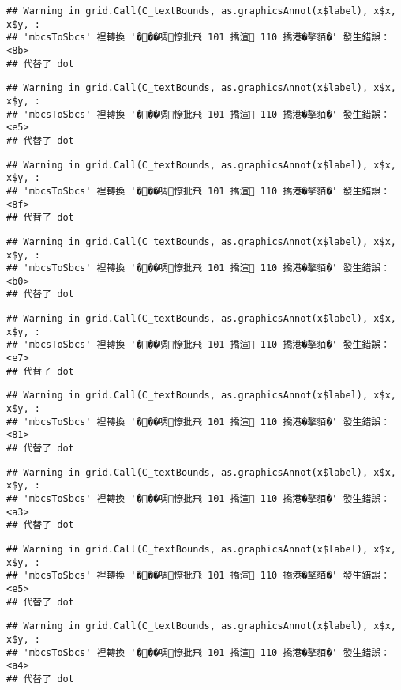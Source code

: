 \documentclass[
]{article}
\begin{document}
\begin{verbatim}
## Warning in grid.Call(C_textBounds, as.graphicsAnnot(x$label), x$x, x$y, :
## 'mbcsToSbcs' 裡轉換 '���啁憭批飛 101 撟渲 110 撟港�摮貊�' 發生錯誤：<8b>
## 代替了 dot
\end{verbatim}

\begin{verbatim}
## Warning in grid.Call(C_textBounds, as.graphicsAnnot(x$label), x$x, x$y, :
## 'mbcsToSbcs' 裡轉換 '���啁憭批飛 101 撟渲 110 撟港�摮貊�' 發生錯誤：<e5>
## 代替了 dot
\end{verbatim}

\begin{verbatim}
## Warning in grid.Call(C_textBounds, as.graphicsAnnot(x$label), x$x, x$y, :
## 'mbcsToSbcs' 裡轉換 '���啁憭批飛 101 撟渲 110 撟港�摮貊�' 發生錯誤：<8f>
## 代替了 dot
\end{verbatim}

\begin{verbatim}
## Warning in grid.Call(C_textBounds, as.graphicsAnnot(x$label), x$x, x$y, :
## 'mbcsToSbcs' 裡轉換 '���啁憭批飛 101 撟渲 110 撟港�摮貊�' 發生錯誤：<b0>
## 代替了 dot
\end{verbatim}

\begin{verbatim}
## Warning in grid.Call(C_textBounds, as.graphicsAnnot(x$label), x$x, x$y, :
## 'mbcsToSbcs' 裡轉換 '���啁憭批飛 101 撟渲 110 撟港�摮貊�' 發生錯誤：<e7>
## 代替了 dot
\end{verbatim}

\begin{verbatim}
## Warning in grid.Call(C_textBounds, as.graphicsAnnot(x$label), x$x, x$y, :
## 'mbcsToSbcs' 裡轉換 '���啁憭批飛 101 撟渲 110 撟港�摮貊�' 發生錯誤：<81>
## 代替了 dot
\end{verbatim}

\begin{verbatim}
## Warning in grid.Call(C_textBounds, as.graphicsAnnot(x$label), x$x, x$y, :
## 'mbcsToSbcs' 裡轉換 '���啁憭批飛 101 撟渲 110 撟港�摮貊�' 發生錯誤：<a3>
## 代替了 dot
\end{verbatim}

\begin{verbatim}
## Warning in grid.Call(C_textBounds, as.graphicsAnnot(x$label), x$x, x$y, :
## 'mbcsToSbcs' 裡轉換 '���啁憭批飛 101 撟渲 110 撟港�摮貊�' 發生錯誤：<e5>
## 代替了 dot
\end{verbatim}

\begin{verbatim}
## Warning in grid.Call(C_textBounds, as.graphicsAnnot(x$label), x$x, x$y, :
## 'mbcsToSbcs' 裡轉換 '���啁憭批飛 101 撟渲 110 撟港�摮貊�' 發生錯誤：<a4>
## 代替了 dot
\end{verbatim}
\end{document}
